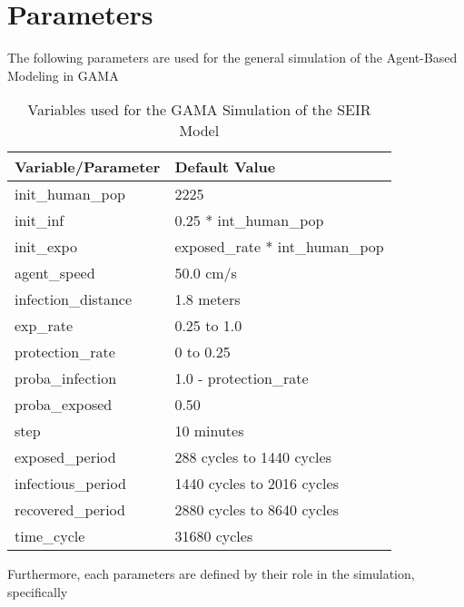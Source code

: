   \section{Parameters}
 The following parameters are used for the general simulation of the Agent-Based Modeling in GAMA
 \begin{table}[H] %
 	\centering
 	\begin{tabular}{ll}
 	\toprule
 		\textbf{Variable/}\textbf{Parameter} & \textbf{Default Value}\\
 	\hline
 		init\_human\_pop & 2225\\
 		init\_inf & 0.25 * int\_human\_pop\\
 		init\_expo & exposed\_rate * int\_human\_pop \\
 		agent\_speed & 50.0 cm/s\\
 		infection\_distance & 1.8 meters\\
 		exp\_rate & 0.25 to 1.0\\
 		protection\_rate & 0 to 0.25\\
 		proba\_infection & 1.0 - protection\_rate\\
 		proba\_exposed & 0.50\\
 		step & 10 minutes\\
 		exposed\_period & 288 cycles to 1440 cycles\\
 		infectious\_period & 1440 cycles to 2016 cycles\\
 		recovered\_period & 2880 cycles to 8640 cycles\\ 
 		time\_cycle & 31680 cycles\\
 		\bottomrule
 	\end{tabular}
 	\caption{Variables used for the GAMA Simulation of the SEIR Model }
 \end{table}
 Furthermore, each parameters are defined by their role in the simulation, specifically
